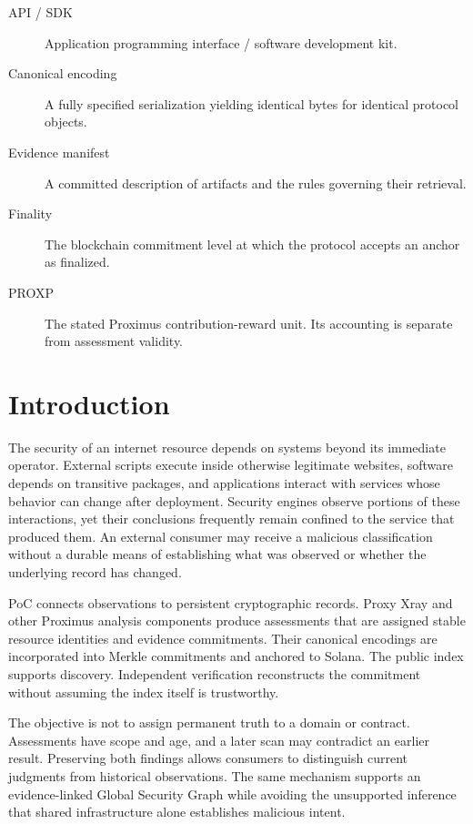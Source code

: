 \documentclass[10pt,a4paper]{article}
\begin{document}
\begin{description}
\item[API / SDK] Application programming interface / software development kit.
\item[Canonical encoding] A fully specified serialization yielding identical bytes for identical protocol objects.
\item[Evidence manifest] A committed description of artifacts and the rules governing their retrieval.
\item[Finality] The blockchain commitment level at which the protocol accepts an anchor as finalized.
\item[PROXP] The stated Proximus contribution-reward unit. Its accounting is separate from assessment validity.
\end{description}

\section*{Introduction}
The security of an internet resource depends on systems beyond its immediate operator. External scripts execute inside otherwise legitimate websites, software depends on transitive packages, and applications interact with services whose behavior can change after deployment. Security engines observe portions of these interactions, yet their conclusions frequently remain confined to the service that produced them. An external consumer may receive a malicious classification without a durable means of establishing what was observed or whether the underlying record has changed.


PoC connects observations to persistent cryptographic records. Proxy Xray and other Proximus analysis components produce assessments that are assigned stable resource identities and evidence commitments. Their canonical encodings are incorporated into Merkle commitments and anchored to Solana. The public index supports discovery. Independent verification reconstructs the commitment without assuming the index itself is trustworthy.


The objective is not to assign permanent truth to a domain or contract. Assessments have scope and age, and a later scan may contradict an earlier result. Preserving both findings allows consumers to distinguish current judgments from historical observations. The same mechanism supports an evidence-linked Global Security Graph while avoiding the unsupported inference that shared infrastructure alone establishes malicious intent.
\end{document}
